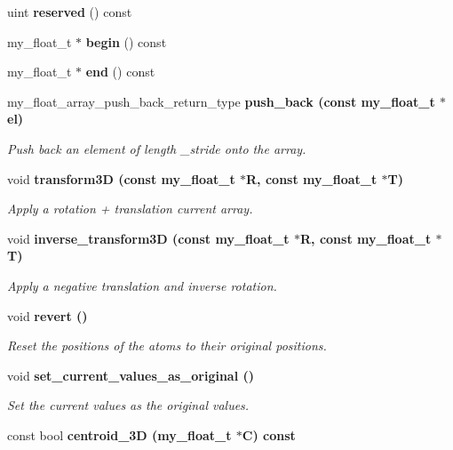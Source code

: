 \begin{CompactItemize}
\item 
uint \textbf{reserved} () const \label{classASCbase_1_1my__float__array_ad39c32e4901faa77e113451f3292cd5}

\item 
my\_\-float\_\-t $\ast$ \textbf{begin} () const \label{classASCbase_1_1my__float__array_764b70c62326d6ed689ecc3fdce08c5a}

\item 
my\_\-float\_\-t $\ast$ \textbf{end} () const \label{classASCbase_1_1my__float__array_62e4444b755858beec023de8d9fceeef}

\item 
my\_\-float\_\-array\_\-push\_\-back\_\-return\_\-type \bf{push\_\-back} (const my\_\-float\_\-t $\ast$el)
\begin{CompactList}\small\item\em Push back an element of length \_\-stride onto the array. \item\end{CompactList}\item 
void \bf{transform3D} (const my\_\-float\_\-t $\ast$R, const my\_\-float\_\-t $\ast$T)
\begin{CompactList}\small\item\em Apply a rotation + translation current array. \item\end{CompactList}\item 
void \bf{inverse\_\-transform3D} (const my\_\-float\_\-t $\ast$R, const my\_\-float\_\-t $\ast$T)
\begin{CompactList}\small\item\em Apply a negative translation and inverse rotation. \item\end{CompactList}\item 
void \bf{revert} ()\label{classASCbase_1_1my__float__array_5612962a30bbc36661eab21d94a172a7}

\begin{CompactList}\small\item\em Reset the positions of the atoms to their original positions. \item\end{CompactList}\item 
void \bf{set\_\-current\_\-values\_\-as\_\-original} ()
\begin{CompactList}\small\item\em Set the current values as the original values. \item\end{CompactList}\item 
const bool \bf{centroid\_\-3D} (my\_\-float\_\-t $\ast$C) const \label{classASCbase_1_1my__float__array_c716853fd605ff6e32d4ede02cedb7b0}


\end{CompactItemize}
